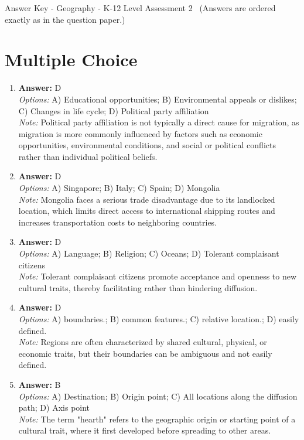 \documentclass[12pt]{article}
\begin{document}
\begin{center}
Answer Key - Geography - K-12 Level Assessment 2 \
\small (Answers are ordered exactly as in the question paper.)
\end{center}

\section*{Multiple Choice}
\begin{enumerate}[label=\arabic*.]
\item \textbf{Answer:} D
\\ \textit{Options:} A) Educational opportunities; B) Environmental appeals or dislikes; C) Changes in life cycle; D) Political party affiliation
\\ \textit{Note:} Political party affiliation is not typically a direct cause for migration, as migration is more commonly influenced by factors such as economic opportunities, environmental conditions, and social or political conflicts rather than individual political beliefs.
\item \textbf{Answer:} D
\\ \textit{Options:} A) Singapore; B) Italy; C) Spain; D) Mongolia
\\ \textit{Note:} Mongolia faces a serious trade disadvantage due to its landlocked location, which limits direct access to international shipping routes and increases transportation costs to neighboring countries.
\item \textbf{Answer:} D
\\ \textit{Options:} A) Language; B) Religion; C) Oceans; D) Tolerant complaisant citizens
\\ \textit{Note:} Tolerant complaisant citizens promote acceptance and openness to new cultural traits, thereby facilitating rather than hindering diffusion.
\item \textbf{Answer:} D
\\ \textit{Options:} A) boundaries.; B) common features.; C) relative location.; D) easily defined.
\\ \textit{Note:} Regions are often characterized by shared cultural, physical, or economic traits, but their boundaries can be ambiguous and not easily defined.
\item \textbf{Answer:} B
\\ \textit{Options:} A) Destination; B) Origin point; C) All locations along the diffusion path; D) Axis point
\\ \textit{Note:} The term "hearth" refers to the geographic origin or starting point of a cultural trait, where it first developed before spreading to other areas.
\end{enumerate}
\end{document}
